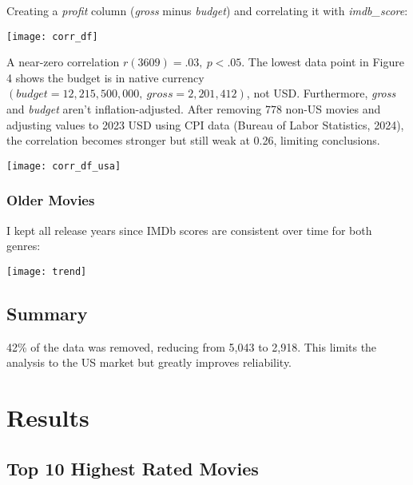 \documentclass[11pt]{article}
\begin{document}
Creating a \textit{profit} column (\textit{gross} minus \textit{budget}) and correlating it with \textit{imdb\_score}:

\begin{center}
    \texttt{[image: corr\_df]}
\end{center}

\pagebreak
A near-zero correlation $r(3609) = .03,~p < .05$. The lowest data point in Figure 4 shows the budget is in native currency $(budget = 12,215,500,000,~gross = 2,201,412)$, not USD. Furthermore, \textit{gross} and \textit{budget} aren’t inflation-adjusted. After removing 778 non-US movies and adjusting values to 2023 USD using CPI data (Bureau of Labor Statistics, 2024), the correlation becomes stronger but still weak at 0.26, limiting conclusions.

\begin{center}
    \texttt{[image: corr\_df\_usa]}
\end{center}

\subsubsection{Older Movies}

I kept all release years since IMDb scores are consistent over time for both genres:

\begin{center}
    \texttt{[image: trend]}
\end{center}

\subsection{Summary}

42\% of the data was removed, reducing from 5,043 to 2,918. This limits the analysis to the US market but greatly improves reliability.

\pagebreak
\section{Results}

\subsection{Top 10 Highest Rated Movies}
\end{document}
